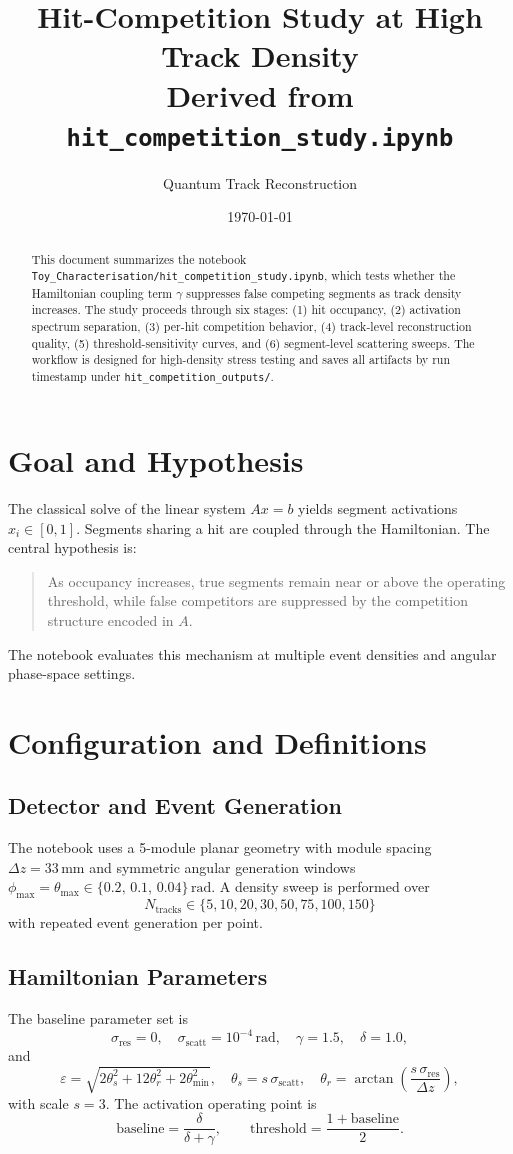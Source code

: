 \documentclass[11pt,a4paper]{article}
\title{Hit-Competition Study at High Track Density\\\large Derived from \texttt{hit\_competition\_study.ipynb}}
\author{Quantum Track Reconstruction}
\date{\today}
\begin{document}
\maketitle

\begin{abstract}
This document summarizes the notebook
\texttt{Toy\_Characterisation/hit\_competition\_study.ipynb}, which tests
whether the Hamiltonian coupling term $\gamma$ suppresses false competing
segments as track density increases. The study proceeds through six stages:
(1) hit occupancy, (2) activation spectrum separation, (3) per-hit
competition behavior, (4) track-level reconstruction quality, (5)
threshold-sensitivity curves, and (6) segment-level scattering sweeps. The
workflow is designed for high-density stress testing and saves all artifacts by
run timestamp under \texttt{hit\_competition\_outputs/}.
\end{abstract}

\section{Goal and Hypothesis}
The classical solve of the linear system $Ax=b$ yields segment activations
$x_i \in [0,1]$. Segments sharing a hit are coupled through the Hamiltonian.
The central hypothesis is:
\begin{quote}
As occupancy increases, true segments remain near or above the operating
threshold, while false competitors are suppressed by the competition structure
encoded in $A$.
\end{quote}

The notebook evaluates this mechanism at multiple event densities and angular
phase-space settings.

\section{Configuration and Definitions}
\subsection{Detector and Event Generation}
The notebook uses a 5-module planar geometry with module spacing
$\Delta z = 33\,\mathrm{mm}$ and symmetric angular generation windows
$\phi_{\max}=\theta_{\max}\in\{0.2,\,0.1,\,0.04\}\,\mathrm{rad}$.
A density sweep is performed over
\[
N_\text{tracks}\in\{5,10,20,30,50,75,100,150\}
\]
with repeated event generation per point.

\subsection{Hamiltonian Parameters}
The baseline parameter set is
\[
\sigma_{\mathrm{res}}=0,\quad
\sigma_{\mathrm{scatt}}=10^{-4}\,\mathrm{rad},\quad
\gamma=1.5,\quad
\delta=1.0,
\]
and
\[
\varepsilon=\sqrt{2\theta_s^2 + 12\theta_r^2 + 2\theta_{\min}^2},
\quad
\theta_s=s\,\sigma_{\mathrm{scatt}},
\quad
\theta_r=\arctan\!\left(\frac{s\,\sigma_{\mathrm{res}}}{\Delta z}\right),
\]
with scale $s=3$. The activation operating point is
\[
\text{baseline}=\frac{\delta}{\delta+\gamma},
\qquad
\text{threshold}=\frac{1+\text{baseline}}{2}.
\]
\end{document}
